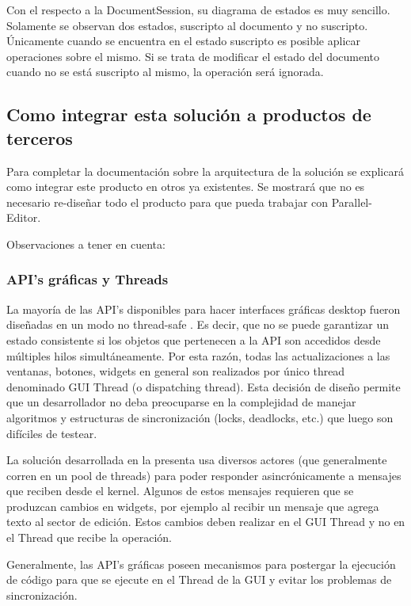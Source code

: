 \documentclass[12pt,a4paper]{article}
\begin{document}
Con el respecto a la DocumentSession, su diagrama de estados es muy sencillo. Solamente se observan dos estados, suscripto al
documento y no suscripto. Únicamente cuando se encuentra en el estado suscripto es posible aplicar operaciones sobre el mismo.
Si se trata de modificar el estado del documento cuando no se está suscripto al mismo, la operación será ignorada.

\subsection{Como integrar esta solución a productos de terceros}
Para completar la documentación sobre la arquitectura de la solución se explicará como integrar este producto en otros ya
existentes. Se mostrará que no es necesario re-diseñar todo el producto para que pueda trabajar con Parallel-Editor.

Observaciones a tener en cuenta:

\subsubsection{API’s gráficas y Threads}

La mayoría de las API’s disponibles para hacer interfaces gráficas desktop fueron diseñadas en un 
modo no thread-safe \cite{threads-swing} \cite{threads-swt}. Es decir, que no se puede garantizar un estado 
consistente si los objetos que pertenecen a la API son accedidos desde múltiples hilos simultáneamente. 
Por esta razón, todas las actualizaciones a las ventanas, botones, widgets
en general son realizados por único thread denominado GUI Thread (o dispatching thread). Esta decisión de diseño permite que
un desarrollador no deba preocuparse en la complejidad de manejar algoritmos y estructuras de sincronización
(locks, deadlocks, etc.) que luego son difíciles de testear.

La solución desarrollada en la presenta usa diversos actores (que generalmente corren en un pool de threads) para poder 
responder asincrónicamente a mensajes que reciben desde el kernel. Algunos de estos mensajes requieren que se produzcan
cambios en widgets, por ejemplo al recibir un mensaje que agrega texto al sector de edición. Estos cambios deben realizar en
el GUI Thread y no en el Thread que recibe la operación.

Generalmente, las API’s gráficas poseen mecanismos para postergar la ejecución de código para que se ejecute en el Thread de
la GUI \cite{swing-invoke-later} \cite{swt-async} y evitar los problemas de sincronización.
\end{document}
